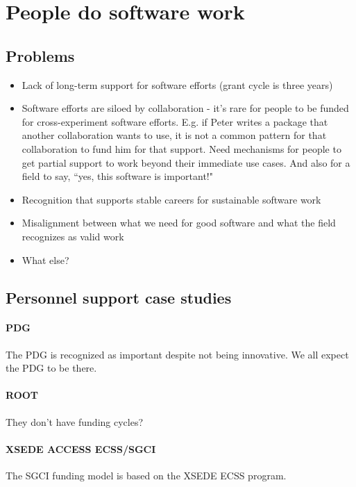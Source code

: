 \section{People do software work} 

\subsection{Problems}
\begin{itemize}
    \item Lack of long-term support for software efforts (grant cycle is three years)
    \item Software efforts are siloed by collaboration - it's rare for people to be funded for cross-experiment software efforts.  E.g. if Peter writes a package that another collaboration wants to use, it is not a common pattern for that collaboration to fund him for that support.  Need mechanisms for people to get partial support to work beyond their immediate use cases.  And also for a field to say, ``yes, this software is important!"
    \item Recognition that supports stable careers for sustainable software work
    \item Misalignment between what we need for good software and what the field recognizes as valid work
    \item What else?
\end{itemize}


\subsection{Personnel support case studies}
\paragraph{PDG}
The PDG is recognized as important despite not being innovative.  We all expect the PDG to be there.

\paragraph{ROOT}
They don't have funding cycles? \cite{Naumann:2022pub}

\paragraph{XSEDE ACCESS ECSS/SGCI}

The SGCI funding model is based on the XSEDE ECSS program.   


